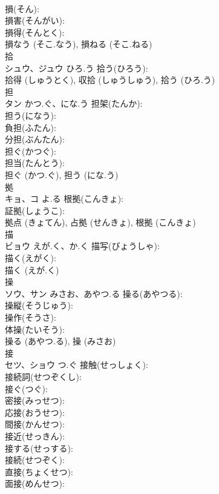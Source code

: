 \documentclass[8pt]{extreport}
\begin{document}
\begin{CJK}{UTF8}{min}
\\	損(そん): 
\\	損害(そんがい): 
\\	損得(そんとく): 
\\	損なう (そこ.なう), 損ねる (そこ.ねる)
\\	拾			
\\	シュウ、ジュウ	ひろ.う	拾う(ひろう): 
\\	拾得 (しゅうとく), 収拾 (しゅうしゅう), 拾う (ひろ.う)
\\	担			
\\	タン	かつ.ぐ、にな.う	担架(たんか): 
\\	担う(になう): 
\\	負担(ふたん): 
\\	分担(ぶんたん): 
\\	担ぐ(かつぐ): 
\\	担当(たんとう): 
\\	担ぐ (かつ.ぐ), 担う (にな.う)
\\	拠			
\\	キョ、コ	よ.る	根拠(こんきょ): 
\\	証拠(しょうこ): 
\\	拠点 (きょてん), 占拠 (せんきょ), 根拠 (こんきょ)
\\	描			
\\	ビョウ	えが.く、か.く	描写(びょうしゃ): 
\\	描く(えがく): 
\\	描く (えが.く)
\\	操			
\\	ソウ、サン	みさお、あやつ.る	操る(あやつる): 
\\	操縦(そうじゅう): 
\\	操作(そうさ): 
\\	体操(たいそう): 
\\	操る (あやつ.る), 操 (みさお)
\\	接			
\\	セツ、ショウ	つ.ぐ	接触(せっしょく): 
\\	接続詞(せつぞくし): 
\\	接ぐ(つぐ): 
\\	密接(みっせつ): 
\\	応接(おうせつ): 
\\	間接(かんせつ): 
\\	接近(せっきん): 
\\	接する(せっする): 
\\	接続(せつぞく): 
\\	直接(ちょくせつ): 
\\	面接(めんせつ): 

\end{CJK}
\end{document}
